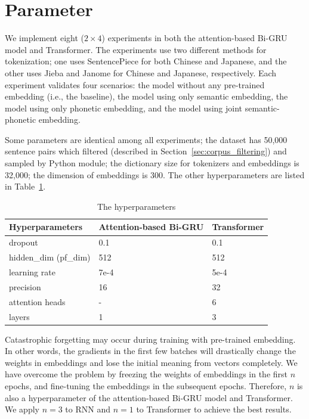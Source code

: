 \section{Parameter} \label{sec:parameter}

We implement eight ($2\!\times\!4$) experiments in both the attention-based Bi-GRU model and Transformer. The experiments use two different methods for tokenization; one uses SentencePiece for both Chinese and Japanese, and the other uses Jieba and Janome for Chinese and Japanese, respectively. Each experiment validates four scenarios: the model without any pre-trained embedding (i.e., the baseline), the model using only semantic embedding, the model using only phonetic embedding, and the model using joint semantic-phonetic embedding.

Some parameters are identical among all experiments; the dataset has 50,000 sentence pairs which filtered (described in Section~\ref{sec:corpus_filtering}) and sampled by Python  module; the dictionary size for tokenizers and embeddings is 32,000; the dimension of embeddings is 300. The other hyperparameters are listed in Table~\ref{tab:hyperparameters}.

\vspace{0.4cm}
\begin{table}[h]
    \centering
    \begin{tabularx}{\textwidth}{bbb}\toprule
        Hyperparameters & Attention-based Bi-GRU & Transformer \\\midrule
        dropout & 0.1 & 0.1 \\
        hidden\_dim (pf\_dim) & 512 & 512 \\
        learning rate & 7e-4 & 5e-4 \\
        precision & 16 & 32 \\
        attention heads & - & 6 \\
        layers & 1 & 3 \\ 
        \bottomrule
    \end{tabularx}
    \caption{The hyperparameters}
    \label{tab:hyperparameters}
\end{table}

Catastrophic forgetting \cite{kirkpatrick2017overcoming} may occur during training with pre-trained embedding. In other words, the gradients in the first few batches will drastically change the weights in embeddings and lose the initial meaning from vectors completely. We have overcome the problem by freezing the weights of embeddings in the first $n$ epochs, and fine-tuning the embeddings in the subsequent epochs. Therefore, $n$ is also a hyperparameter of the attention-based Bi-GRU model and Transformer. We apply $n=3$ to RNN and $n=1$ to Transformer to achieve the best results.

